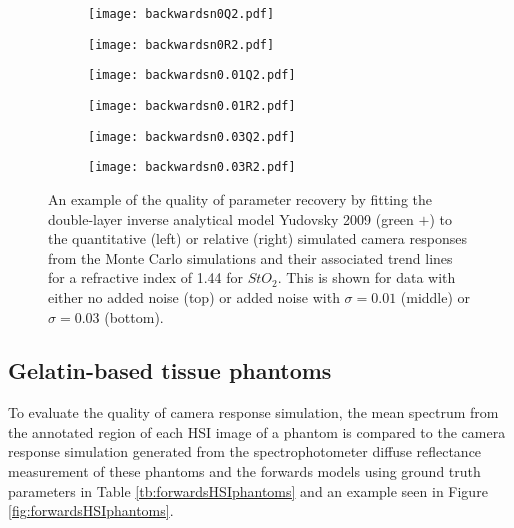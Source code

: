 \begin{figure}[h!]
    \centering
    \begin{subfigure}{0.49\textwidth}
        \texttt{[image: backwardsn0Q2.pdf]}
        \caption{}
        \label{fig:backwardsn0Q2}
    \end{subfigure}
    \begin{subfigure}{0.49\textwidth}
        \texttt{[image: backwardsn0R2.pdf]}
        \caption{}
        \label{fig:backwardsn0R2}
    \end{subfigure}
    \begin{subfigure}{0.49\textwidth}
        \texttt{[image: backwardsn0.01Q2.pdf]}
        \caption{}
        \label{fig:backwardsn0.01Q2}
    \end{subfigure}
    \begin{subfigure}{0.49\textwidth}
        \texttt{[image: backwardsn0.01R2.pdf]}
        \caption{}
        \label{fig:backwardsm0.01R2}
    \end{subfigure}
    \begin{subfigure}{0.49\textwidth}
        \texttt{[image: backwardsn0.03Q2.pdf]}
        \caption{}
        \label{fig:backwardsn0.03Q2}
    \end{subfigure}
    \begin{subfigure}{0.49\textwidth}
        \texttt{[image: backwardsn0.03R2.pdf]}
        \caption{}
        \label{fig:backwardsm0.03R2}
    \end{subfigure}
    \caption{An example of the quality of parameter recovery by fitting the double-layer inverse analytical model Yudovsky 2009 (\textcolor{MyGreen}{green $+$}) to the quantitative (left) or relative (right) simulated camera responses from the Monte Carlo simulations and their associated trend lines for a refractive index of 1.44 for $StO_2$. This is shown for data with either no added noise (top) or added noise with $\sigma = 0.01$ (middle) or $\sigma = 0.03$ (bottom).}
    \label{fig:backwardsHSIMC2}
\end{figure}
\FloatBarrier

\subsection{Gelatin-based tissue phantoms}
To evaluate the quality of camera response simulation, the mean spectrum from the annotated region of each HSI image of a phantom is compared to the camera response simulation generated from the spectrophotometer diffuse reflectance measurement of these phantoms and the forwards models using ground truth parameters in Table \ref{tb:forwardsHSIphantoms} and an example seen in Figure \ref{fig:forwardsHSIphantoms}. 

